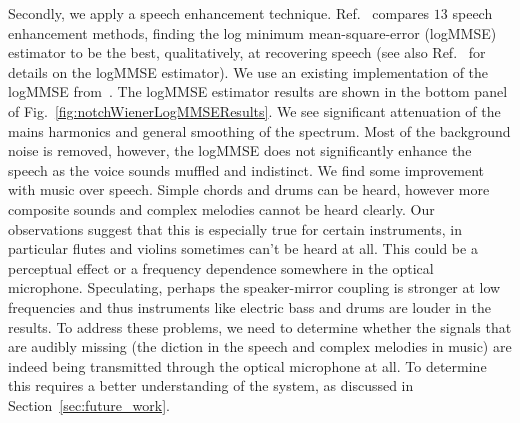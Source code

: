 \documentclass[paper-main.tex]{subfiles}
\begin{document}
Secondly, we apply a speech enhancement technique. 
Ref.~\cite{SubjectiveComparison} compares $13$ speech enhancement methods, finding the log minimum mean-square-error (logMMSE) estimator to be the best, qualitatively, at recovering speech (see also Ref.~\cite{Ephraim1984SpeechEU_logMMSE} for details on the logMMSE estimator). 
We use an existing implementation of the logMMSE from~\cite{logmmse}.  
The logMMSE estimator results are shown in the bottom panel of Fig.~\ref{fig:notchWienerLogMMSEResults}. 
We see significant attenuation of the mains harmonics and general smoothing of the spectrum. 
Most of the background noise is removed, however, the logMMSE does not significantly enhance the speech as the voice sounds muffled and indistinct.
We find some improvement with music over speech. 
Simple chords and drums can be heard, however more composite sounds and complex melodies cannot be heard clearly. 
Our observations suggest that this is especially true for certain instruments, in particular flutes and violins sometimes can’t be heard at all. 
This could be a perceptual effect or a frequency dependence somewhere in the optical microphone.
Speculating, perhaps the speaker-mirror coupling is stronger at low frequencies and thus instruments like electric bass and drums are louder in the results.
To address these problems, we need to determine whether the signals that are audibly missing (the diction in the speech and complex melodies in music) are indeed being transmitted through the optical microphone at all. 
To determine this requires a better understanding of the system, as discussed in Section~\ref{sec:future_work}.
\end{document}
